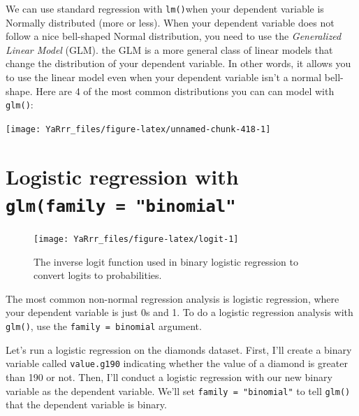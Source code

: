 \documentclass[]{book}
\theoremstyle{definition}
\theoremstyle{definition}
\theoremstyle{remark}
\begin{document}
We can use standard regression with \texttt{lm()}when your dependent
variable is Normally distributed (more or less). When your dependent
variable does not follow a nice bell-shaped Normal distribution, you
need to use the \emph{Generalized Linear Model} (GLM). the GLM is a more
general class of linear models that change the distribution of your
dependent variable. In other words, it allows you to use the linear
model even when your dependent variable isn't a normal bell-shape. Here
are 4 of the most common distributions you can can model with
\texttt{glm()}:

\begin{center}\texttt{[image: YaRrr\_files/figure-latex/unnamed-chunk-418-1]} \end{center}

\section{\texorpdfstring{Logistic regression with
\texttt{glm(family\ =\ "binomial"}}{Logistic regression with glm(family = "binomial"}}\label{logistic-regression-with-glmfamily-binomial}

\begin{figure}

{\centering \texttt{[image: YaRrr\_files/figure-latex/logit-1]} 

}

\caption{The inverse logit function used in binary logistic regression to convert logits to probabilities.}\label{fig:logit}
\end{figure}

The most common non-normal regression analysis is logistic regression,
where your dependent variable is just 0s and 1. To do a logistic
regression analysis with \texttt{glm()}, use the
\texttt{family\ =\ binomial} argument.

Let's run a logistic regression on the diamonds dataset. First, I'll
create a binary variable called \texttt{value.g190} indicating whether
the value of a diamond is greater than 190 or not. Then, I'll conduct a
logistic regression with our new binary variable as the dependent
variable. We'll set \texttt{family\ =\ "binomial"} to tell
\texttt{glm()} that the dependent variable is binary.
\end{document}
